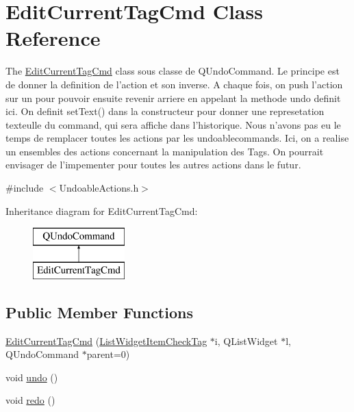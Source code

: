 \hypertarget{class_edit_current_tag_cmd}{\section{Edit\-Current\-Tag\-Cmd Class Reference}
\label{class_edit_current_tag_cmd}
}


The \hyperlink{class_edit_current_tag_cmd}{Edit\-Current\-Tag\-Cmd} class sous classe de Q\-Undo\-Command. Le principe est de donner la definition de l'action et son inverse. A chaque fois, on push l'action sur un  pour pouvoir ensuite revenir arriere en appelant la methode undo definit ici. On definit set\-Text() dans la constructeur pour donner une represetation texteulle du command, qui sera affiche dans l'historique. Nous n'avons pas eu le temps de remplacer toutes les actions par les undoablecommands. Ici, on a realise un ensembles des actions concernant la manipulation des Tags. On pourrait envisager de l'impementer pour toutes les autres actions dans le futur.  




{\ttfamily \#include $<$Undoable\-Actions.\-h$>$}

Inheritance diagram for Edit\-Current\-Tag\-Cmd\-:\begin{figure}[H]
\begin{center}
\leavevmode
\includegraphics[height=2.000000cm]{class_edit_current_tag_cmd}
\end{center}
\end{figure}
\subsection*{Public Member Functions}
\begin{DoxyCompactItemize}
\item 
\hyperlink{class_edit_current_tag_cmd_af70d069e440f0d749717642b44a4427f}{Edit\-Current\-Tag\-Cmd} (\hyperlink{class_list_widget_item_check_tag}{List\-Widget\-Item\-Check\-Tag} $\ast$i, Q\-List\-Widget $\ast$l, Q\-Undo\-Command $\ast$parent=0)
\item 
void \hyperlink{class_edit_current_tag_cmd_a3a798057294de3a9ff1edebf520b688f}{undo} ()
\item 
void \hyperlink{class_edit_current_tag_cmd_a032f07a7b8f6881087cc38f93dd88456}{redo} ()
\end{DoxyCompactItemize}


